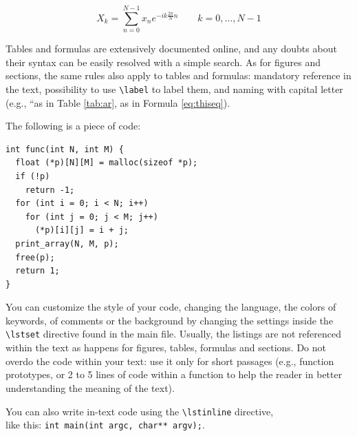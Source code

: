 \begin{equation}\label{eq:thiseq}
X_{k}=\sum _{n=0}^{N-1}x_{n}e^{-ik{\frac {2\pi }{N}}n}\quad \quad k=0,\dots ,N-1
\end{equation}

Tables and formulas are extensively documented online, and any doubts about their syntax can be easily resolved with a simple search. As for figures and sections, the same rules also apply to tables and formulas: mandatory reference in the text, possibility to use \lstinline{\label} to label them, and naming with capital letter (e.g., ``as in Table \ref{tab:ar}, as in Formula \ref{eq:thiseq}).

The following is a piece of code:

\begin{lstlisting}
int func(int N, int M) {
  float (*p)[N][M] = malloc(sizeof *p);
  if (!p)
    return -1;
  for (int i = 0; i < N; i++)
    for (int j = 0; j < M; j++)
      (*p)[i][j] = i + j;
  print_array(N, M, p);
  free(p);
  return 1;
}
\end{lstlisting}

You can customize the style of your code, changing the language, the colors of keywords, of comments or the background by changing the settings inside the \lstinline{\lstset} directive found in the main file. Usually, the listings are not referenced within the text as happens for figures, tables, formulas and sections. Do not overdo the code within your text: use it only for short passages (e.g., function prototypes, or 2 to 5 lines of code within a function to help the reader in better understanding the meaning of the text).

You can also write in-text code using the \lstinline{\lstinline} directive, \\
like this: \lstinline{int main(int argc, char** argv);}.

